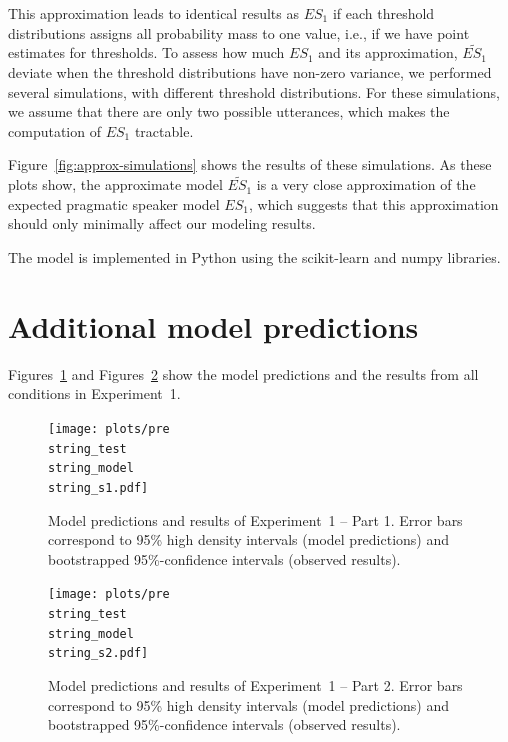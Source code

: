 \documentclass[man, floatsintext]{apa6}
\begin{document}
This approximation leads to identical results as $ES_1$ if each threshold distributions assigns all probability mass to one value, 
i.e., if we have point estimates for thresholds. To assess how much $ES_1$ and its approximation, $\widetilde{ES_1}$ deviate when 
the threshold distributions have non-zero variance, we performed several simulations, with different threshold distributions. For these
simulations, we assume that there are only two possible utterances, which makes the computation of $ES_1$ tractable.

Figure~\ref{fig:approx-simulations} shows the results of these simulations. As these plots show, the approximate model $\widetilde{ES_1}$ is a very close approximation of the expected
pragmatic speaker model $ES_1$, which suggests that this approximation should only minimally affect our modeling results. 

The model is implemented in Python using the scikit-learn \parencite{Scikit2011} and numpy \parencite{vanderWalt2011} libraries.

\section{Additional model predictions}
\setcounter{section}{4}


Figures~\ref{fig:norming-results-model-1} and Figures~\ref{fig:norming-results-model-2} show the model predictions and the results from all conditions in Experiment~1. 

\begin{figure}[h!]
\texttt{[image: plots/pre\\string\_test\\string\_model\\string\_s1.pdf]}
\caption{Model predictions and results of Experiment~1 -- Part 1. Error bars correspond to 95\% high density intervals (model predictions) and bootstrapped 95\%-confidence intervals (observed results). \label{fig:norming-results-model-1}}

\end{figure}

\begin{figure}[h!]
\texttt{[image: plots/pre\\string\_test\\string\_model\\string\_s2.pdf]}
\caption{Model predictions and results of Experiment~1  -- Part 2. Error bars correspond to 95\% high density intervals (model predictions) and bootstrapped 95\%-confidence intervals (observed results). \label{fig:norming-results-model-2}}

\end{figure}
\end{document}
